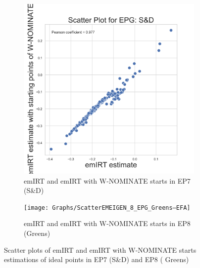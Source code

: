 \documentclass[a4paper,12pt]{report}
\begin{document}
                \begin{figure}[H]
                    \centering
                    \begin{subfigure}[b]{0.48\textwidth}
                        \centering
                        \includegraphics[width=\textwidth]{Graphs/ScatterEMEIGEN_7_EPG_S&D}
                        \caption{emIRT and emIRT with W-NOMINATE starts in EP7 (S\&D)}
                        \label{fig:EMEIGEN_SCATTER_7SD}
                    \end{subfigure}
                    \hfill
                    \begin{subfigure}[b]{0.48\textwidth}
                        \centering
                        \texttt{[image: Graphs/ScatterEMEIGEN\_8\_EPG\_Greens–EFA]}
                        \caption{emIRT and emIRT with W-NOMINATE starts in EP8 (Greens)}
                        \label{fig:EMEIGEN_SCATTER_8Grens}
                    \end{subfigure}
                    \caption
                    {Scatter plots of emIRT and emIRT with W-NOMINATE starts estimations of ideal points in EP7 (S\&D)
                        and EP8 (
                        Greens)}
                    \label{fig:EMEIGEN_SCATTER_7_8SDGREENS}
                \end{figure}
\end{document}
